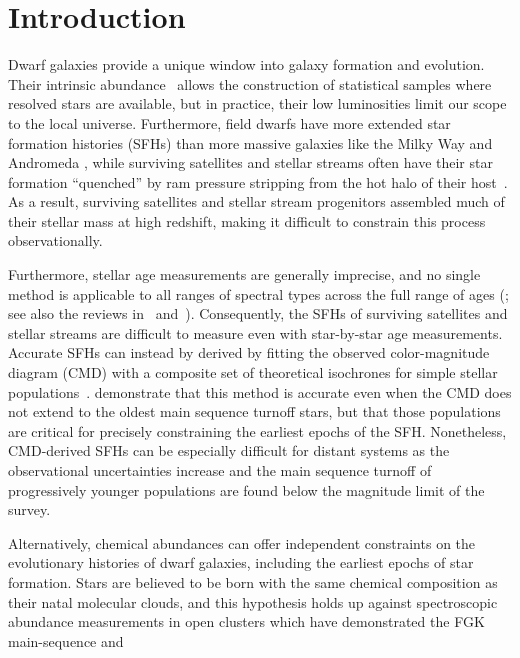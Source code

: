 \documentclass[ms.tex]{subfiles}
\begin{document}
\section{Introduction}
\label{sec:intro}

Dwarf galaxies provide a unique window into galaxy formation and evolution.
Their intrinsic abundance~\citep{Bell2003, Baldry2012} allows the construction
of statistical samples where resolved stars are available, but in practice,
their low luminosities limit our scope to the local universe.
Furthermore, field dwarfs have more extended star formation histories (SFHs)
than more massive galaxies like the Milky Way and Andromeda
\citep[e.g.][]{Behroozi2019}, while surviving satellites and stellar streams
often have their star formation ``quenched'' by ram pressure stripping from the
hot halo of their host~\citep*[see discussion in, e.g.,][]{Steyrleithner2020}.
As a result, surviving satellites and stellar stream progenitors assembled much
of their stellar mass at high redshift, making it difficult to constrain this
process observationally.
\par
Furthermore, stellar age measurements are generally imprecise, and no single
method is applicable to all ranges of spectral types across the full range of
ages (\citealp{Angus2019}; see also the reviews in~\citealp{Soderblom2010}
and~\citealp{Chaplin2013}).
Consequently, the SFHs of surviving satellites and stellar streams are
difficult to measure even with star-by-star age measurements.
Accurate SFHs can instead by derived by fitting the observed color-magnitude
diagram (CMD) with a composite set of theoretical isochrones for simple
stellar populations~\citep[e.g.][]{Dolphin2002}.
\citet{Weisz2014b} demonstrate that this method is accurate even when the CMD
does not extend to the oldest main sequence turnoff stars, but that those
populations are critical for precisely constraining the earliest epochs of the
SFH.
Nonetheless, CMD-derived SFHs can be especially difficult for distant systems
as the observational uncertainties increase and the main sequence turnoff of
progressively younger populations are found below the magnitude limit of the
survey.
\par
Alternatively, chemical abundances can offer independent constraints on the
evolutionary histories of dwarf galaxies, including the earliest epochs of
star formation.
Stars are believed to be born with the same chemical composition as their natal
molecular clouds, and this hypothesis holds up against spectroscopic abundance
measurements in open clusters which have demonstrated the FGK main-sequence and
\end{document}
